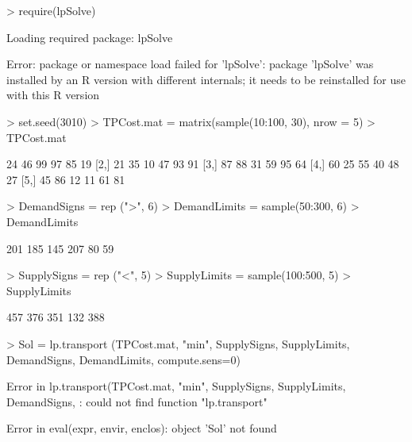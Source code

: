 \begin{Schunk}
\begin{Sinput}
> require(lpSolve)
\end{Sinput}
\begin{Soutput}
Loading required package: lpSolve
\end{Soutput}
\begin{Soutput}
Error: package or namespace load failed for 'lpSolve':
 package 'lpSolve' was installed by an R version with different internals; it needs to be reinstalled for use with this R version
\end{Soutput}
\begin{Sinput}
> set.seed(3010)
> TPCost.mat = matrix(sample(10:100, 30), nrow = 5)
> TPCost.mat
\end{Sinput}
\begin{Soutput}
     [,1] [,2] [,3] [,4] [,5] [,6]
[1,]   24   46   99   97   85   19
[2,]   21   35   10   47   93   91
[3,]   87   88   31   59   95   64
[4,]   60   25   55   40   48   27
[5,]   45   86   12   11   61   81
\end{Soutput}
\begin{Sinput}
> DemandSigns = rep (">", 6)
> DemandLimits = sample(50:300, 6)
> DemandLimits
\end{Sinput}
\begin{Soutput}
[1] 201 185 145 207  80  59
\end{Soutput}
\begin{Sinput}
> SupplySigns = rep ("<", 5)
> SupplyLimits = sample(100:500, 5)
> SupplyLimits
\end{Sinput}
\begin{Soutput}
[1] 457 376 351 132 388
\end{Soutput}
\begin{Sinput}
> Sol = lp.transport (TPCost.mat, "min", SupplySigns, SupplyLimits, DemandSigns, DemandLimits, compute.sens=0)
\end{Sinput}
\begin{Soutput}
Error in lp.transport(TPCost.mat, "min", SupplySigns, SupplyLimits, DemandSigns, : could not find function "lp.transport"
\end{Soutput}
\begin{Soutput}
Error in eval(expr, envir, enclos): object 'Sol' not found
\end{Soutput}
\end{Schunk}




